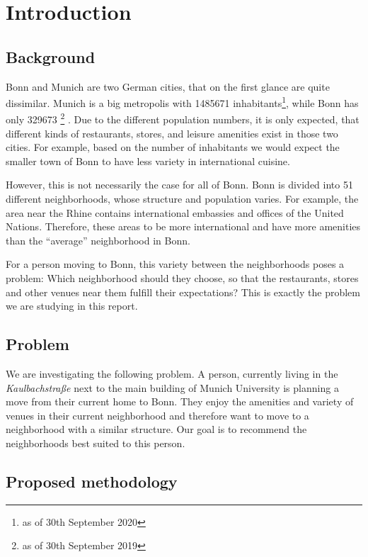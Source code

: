 \documentclass[UKenglish]{scrreprt}
\begin{document}
\chapter{Introduction}
\section{Background}
Bonn and Munich are two German cities, that on the first glance are quite dissimilar. Munich is a big metropolis with \num{1485671} inhabitants\footnote{as of 30th September 2020 }\cite{muenchen}, while Bonn has only \num{329673} \footnote{as of 30th September 2019}
\cite{bonn}. Due to the different population numbers, it is only expected, that different kinds of restaurants, stores, and leisure amenities exist in those two cities. For example, based on the number of inhabitants we would expect the smaller town of Bonn to have less variety in international cuisine. 

However, this is not necessarily the case for all of Bonn. Bonn is divided into 51 different neighborhoods, whose structure and population varies. For example, the area near the Rhine contains international embassies and offices of the United Nations. Therefore, these areas to be more international and have more amenities than the \enquote{average} neighborhood in Bonn.

For a person moving to Bonn, this variety between the neighborhoods poses a problem: Which neighborhood should they choose, so that the restaurants, stores and other venues near them fulfill their expectations? This is exactly the problem we are studying in this report.

\section{Problem}
We are investigating the following problem. A person, currently living in the \emph{Kaulbachstraße} next to the main building of Munich University is planning a move from their current home to Bonn. They enjoy the amenities and variety of venues in their current neighborhood and therefore want to move to a neighborhood with a similar structure. Our goal is to recommend the neighborhoods best suited to this person. 

\section{Proposed methodology}%
\end{document}
